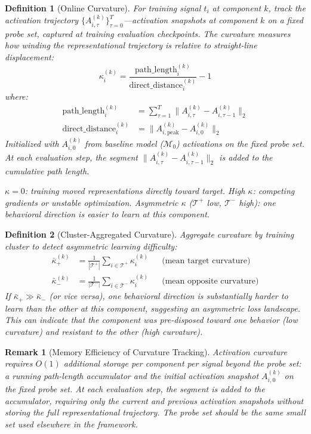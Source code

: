 \documentclass[11pt]{article}
\newtheorem{definition}{Definition}[section]
\newtheorem{remark}{Remark}[section]
\begin{document}
\begin{definition}[Online Curvature]
For training signal $t_i$ at component $k$, track the activation trajectory $\{A^{(k)}_{i,\tau}\}_{\tau=0}^{T}$---activation snapshots at component $k$ on a fixed probe set, captured at training evaluation checkpoints. The curvature measures how winding the representational trajectory is relative to straight-line displacement:
\begin{equation}
\kappa^{(k)}_i = \frac{\text{path\_length}^{(k)}_i}{\text{direct\_distance}^{(k)}_i} - 1
\end{equation}
where:
\begin{align}
\text{path\_length}^{(k)}_i &= \sum_{\tau=1}^{T} \|A^{(k)}_{i,\tau} - A^{(k)}_{i,\tau-1}\|_2 \\[0.5em]
\text{direct\_distance}^{(k)}_i &= \|A^{(k)}_{i,\text{peak}} - A^{(k)}_{i,0}\|_2
\end{align}
Initialized with $A^{(k)}_{i,0}$ from baseline model ($\mathcal{M}_0$) activations on the fixed probe set. At each evaluation step, the segment $\|A^{(k)}_{i,\tau} - A^{(k)}_{i,\tau-1}\|_2$ is added to the cumulative path length.

$\kappa = 0$: training moved representations directly toward target. High $\kappa$: competing gradients or unstable optimization. Asymmetric $\kappa$ ($\mathcal{T}^+$ low, $\mathcal{T}^-$ high): one behavioral direction is easier to learn at this component.
\end{definition}

\begin{definition}[Cluster-Aggregated Curvature]
Aggregate curvature by training cluster to detect asymmetric learning difficulty:
\begin{align}
\bar{\kappa}^{(k)}_+ &= \frac{1}{|\mathcal{T}^+|}\sum_{i \in \mathcal{T}^+} \kappa^{(k)}_i & &\text{(mean target curvature)} \\[0.5em]
\bar{\kappa}^{(k)}_- &= \frac{1}{|\mathcal{T}^-|}\sum_{i \in \mathcal{T}^-} \kappa^{(k)}_i & &\text{(mean opposite curvature)}
\end{align}
If $\bar{\kappa}_+ \gg \bar{\kappa}_-$ (or vice versa), one behavioral direction is substantially harder to learn than the other at this component, suggesting an asymmetric loss landscape. This can indicate that the component was pre-disposed toward one behavior (low curvature) and resistant to the other (high curvature).
\end{definition}

\begin{remark}[Memory Efficiency of Curvature Tracking]
Activation curvature requires $O(1)$ additional storage per component per signal beyond the probe set: a running path-length accumulator and the initial activation snapshot $A^{(k)}_{i,0}$ on the fixed probe set. At each evaluation step, the segment is added to the accumulator, requiring only the current and previous activation snapshots without storing the full representational trajectory. The probe set should be the same small set used elsewhere in the framework.
\end{remark}
\end{document}
